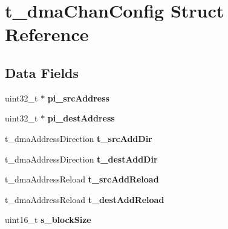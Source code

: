 \hypertarget{structt__dma_chan_config}{\section{t\-\_\-dma\-Chan\-Config Struct Reference}
\label{structt__dma_chan_config}
}
\subsection*{Data Fields}
\begin{DoxyCompactItemize}
\item 
\hypertarget{structt__dma_chan_config_a9b0be49050c4f04aa3b5da11b8edc156}{uint32\-\_\-t $\ast$ {\bfseries pi\-\_\-src\-Address}}\label{structt__dma_chan_config_a9b0be49050c4f04aa3b5da11b8edc156}

\item 
\hypertarget{structt__dma_chan_config_abf558583c64871a15b42be688a100385}{uint32\-\_\-t $\ast$ {\bfseries pi\-\_\-dest\-Address}}\label{structt__dma_chan_config_abf558583c64871a15b42be688a100385}

\item 
\hypertarget{structt__dma_chan_config_aa87ce8a3aac536424d4b834360323d95}{t\-\_\-dma\-Address\-Direction {\bfseries t\-\_\-src\-Add\-Dir}}\label{structt__dma_chan_config_aa87ce8a3aac536424d4b834360323d95}

\item 
\hypertarget{structt__dma_chan_config_a95ac85842d9e05b693db9376f5daf6e3}{t\-\_\-dma\-Address\-Direction {\bfseries t\-\_\-dest\-Add\-Dir}}\label{structt__dma_chan_config_a95ac85842d9e05b693db9376f5daf6e3}

\item 
\hypertarget{structt__dma_chan_config_a1395f09edeb1c8ce6bf723300deafa0e}{t\-\_\-dma\-Address\-Reload {\bfseries t\-\_\-src\-Add\-Reload}}\label{structt__dma_chan_config_a1395f09edeb1c8ce6bf723300deafa0e}

\item 
\hypertarget{structt__dma_chan_config_a05afca3af0a4ccf4b202641126286d8e}{t\-\_\-dma\-Address\-Reload {\bfseries t\-\_\-dest\-Add\-Reload}}\label{structt__dma_chan_config_a05afca3af0a4ccf4b202641126286d8e}

\item 
\hypertarget{structt__dma_chan_config_a528845635bc947ad147113703a5f18db}{uint16\-\_\-t {\bfseries s\-\_\-block\-Size}}\label{structt__dma_chan_config_a528845635bc947ad147113703a5f18db}


\end{DoxyCompactItemize}

